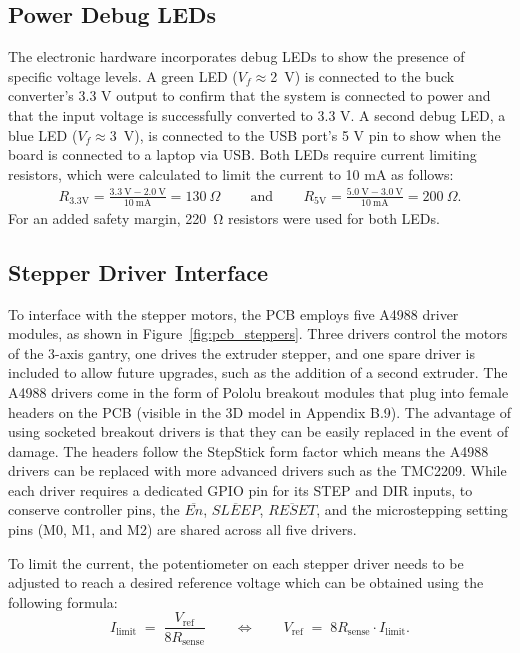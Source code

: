 \subsection{Power Debug LEDs}
The electronic hardware incorporates debug LEDs to show the presence of specific voltage levels. A green LED ($V_f \approx$\SI{2}{V}) is connected to the buck converter's 3.3 V output to confirm that the system is connected to power and that the input voltage is successfully converted to 3.3 V. A second debug LED, a blue LED ($V_f \approx$\SI{3}{V}), is connected to the USB port's 5 V pin to show when the board is connected to a laptop via USB. Both LEDs require current limiting resistors, which were calculated to limit the current to 10 mA as follows:
\begin{align*}
R_{3.3\text{V}} = \frac{3.3\ \text{V} - 2.0\ \text{V}}{10\ \text{mA}}
= 130\ \Omega
\,\,\,\,\,\,\,\,\,\,\, \text{ and } \,\,\,\,\,\,\,\,\,\,\,
R_{5\text{V}} = \frac{5.0\ \text{V} - 3.0\ \text{V}}{10\ \text{mA}}
= 200\ \Omega.
\end{align*}
For an added safety margin, \SI{220}{\ohm} resistors were used for both LEDs.

\subsection{Stepper Driver Interface}
To interface with the stepper motors, the PCB employs five A4988 driver modules, as shown in Figure~\ref{fig:pcb_steppers}. Three drivers control the motors of the 3-axis gantry, one drives the extruder stepper, and one spare driver is included to allow future upgrades, such as the addition of a second extruder. The A4988 drivers come in the form of Pololu breakout modules that plug into female headers on the PCB (visible in the 3D model in Appendix B.9). The advantage of using socketed breakout drivers is that they can be easily replaced in the event of damage. The headers follow the StepStick form factor which means the A4988 drivers can be replaced with more advanced drivers such as the TMC2209. While each driver requires a dedicated GPIO pin for its STEP and DIR inputs, to conserve controller pins, the $\overline{En}$, $\overline{SLEEP}$, $\overline{RESET}$, and the microstepping setting pins (M0, M1, and M2) are shared across all five drivers.

To limit the current, the potentiometer on each stepper driver needs to be adjusted to reach a desired reference voltage which can be obtained using the following formula: 
\[
I_{\text{limit}} \;=\; \frac{V_{\text{ref}}}{8 R_{\text{sense}}}
\qquad\Longleftrightarrow\qquad
V_{\text{ref}} \;=\; 8R_{\text{sense}}\cdot I_{\text{limit}}.
\]


